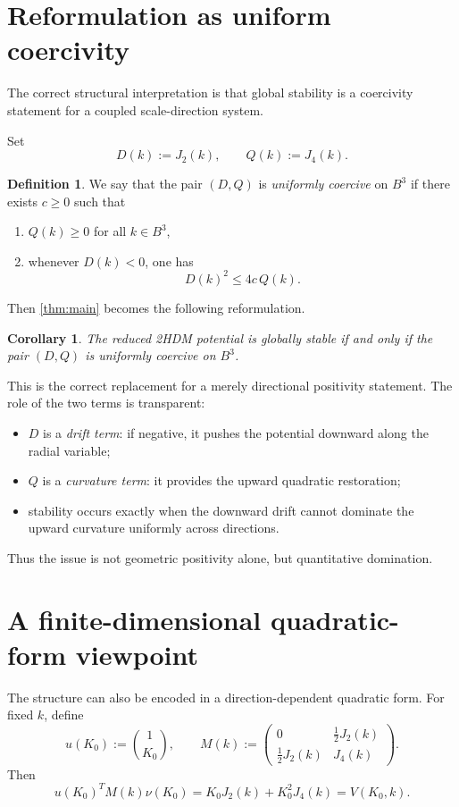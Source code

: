 \documentclass[11pt,a4paper]{article}
\theoremstyle{plain}
\newtheorem{corollary}[theorem]{Corollary}
\theoremstyle{definition}
\newtheorem{definition}[theorem]{Definition}
\theoremstyle{remark}
\begin{document}
\section{Reformulation as uniform coercivity}

The correct structural interpretation is that global stability is a coercivity statement for a coupled scale-direction system.

Set
\[
D(k):=J_2(k),\qquad Q(k):=J_4(k).
\]

\begin{definition}
We say that the pair $(D,Q)$ is \emph{uniformly coercive} on $B^3$ if there exists $c\ge 0$ such that
\begin{enumerate}[label=(\roman*),leftmargin=2em]
\item $Q(k)\ge 0$ for all $k\in B^3$,
\item whenever $D(k)<0$, one has
\[
D(k)^2\le 4c\,Q(k).
\]
\end{enumerate}
\end{definition}

Then \cref{thm:main} becomes the following reformulation.

\begin{corollary}\label{cor:coercivity}
The reduced 2HDM potential is globally stable if and only if the pair $(D,Q)$ is uniformly coercive on $B^3$.
\end{corollary}

This is the correct replacement for a merely directional positivity statement. The role of the two terms is transparent:
\begin{itemize}[leftmargin=1.8em]
\item $D$ is a \emph{drift term}: if negative, it pushes the potential downward along the radial variable;
\item $Q$ is a \emph{curvature term}: it provides the upward quadratic restoration;
\item stability occurs exactly when the downward drift cannot dominate the upward curvature uniformly across directions.
\end{itemize}
Thus the issue is not geometric positivity alone, but quantitative domination.

\section{A finite-dimensional quadratic-form viewpoint}

The structure can also be encoded in a direction-dependent quadratic form. For fixed $k$, define
\[
u(K_0):=\binom{1}{K_0},
\qquad
M(k):=
\begin{pmatrix}
0 & \tfrac12 J_2(k)\\[1ex]
\tfrac12 J_2(k) & J_4(k)
\end{pmatrix}.
\]
Then
\[
u(K_0)^TM(k)\nu(K_0)=K_0J_2(k)+K_0^2J_4(k)=V(K_0,k).
\]
\end{document}
